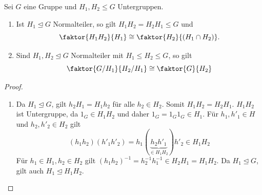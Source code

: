 \begin{satz}[Isomorphiesätze]\label{satz1_21}
	Sei $G$ eine Gruppe und $H_1, H_2 \leq G$ Untergruppen.
	\begin{enumerate}[label=(\alph*)]
		\item Ist $H_1 \unlhd G$ Normalteiler, so gilt $H_1H_2 = H_2H_1 \leq G$ und
		\[\faktor{H_1H_2}{H_1} \cong \faktor{H_2}{(H_1 \cap H_2)}.\]
		\item Sind $H_1, H_2 \unlhd G$ Normalteiler mit $H_1 \leq H_2 \leq G$, so gilt
		\[\faktor{G/H_1}{H_2/H_1} \cong \faktor{G}{H_2}\]
	\end{enumerate}
\end{satz}
\begin{proof}
	\begin{enumerate}[label=(\alph*)]
		\item Da $H_1 \unlhd G$, gilt $h_2 H_1 = H_1 h_2$ für alle $h_2 \in H_2$. Somit $H_1H_2 = H_2H_1$. $H_1H_2$ ist Untergruppe, da $1_G \in H_1H_2$ und daher $1_G = 1_G 1_G \in H_1$. Für $h_1, h'_1 \in H$ und $h_2, h'_2 \in H_2$ gilt 
		\[(h_1h_2)(h'_1h'_2) = h_1(\underbrace{h_2h'_1}_{\in H_1H_2}) h'_2 \in H_1 H_2 \]
		Für $h_1 \in H_1, h_2 \in H_2$ gilt $(h_1h_2)^{-1} = h_2^{-1} h_1^{-1} \in H_2 H_1 = H_1 H_2$. Da $H_1 \unlhd G$, gilt auch $H_1 \unlhd H_1H_2$.
		

\end{enumerate}
\end{proof}
